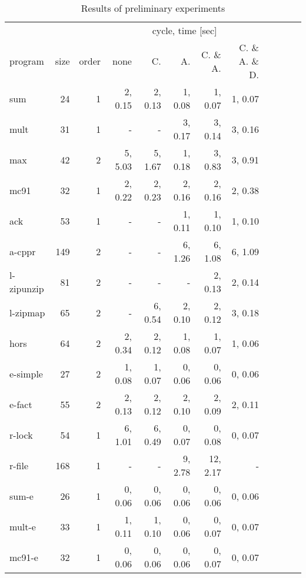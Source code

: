 \begin{table*}
\caption{Results of preliminary experiments}
\label{tbl:exp}
\small
\begin{center}
\begin{tabular}{|l|r|r|r|r|r|r|r|r|r|r|r|}
\hline
            &       &    & \multicolumn{5}{|c|}{cycle, time [sec]} \\
\cline{4-8}
program    & size & order & none &     C. &   A. &    C. \& A. & C. \& A. \& D. \\
\hline
sum               &    24&  1&  2,    0.15 & 2,    0.13 & 1,    0.08 & 1,    0.07 & 1,    0.07 \\
mult              &    31&  1&           - &          - & 3,    0.17 & 3,    0.14 & 3,    0.16 \\
max               &    42&  2&  5,    5.03 & 5,    1.67 & 1,    0.18 & 3,    0.83 & 3,    0.91 \\
mc91              &    32&  1&  2,    0.22 & 2,    0.23 & 2,    0.16 & 2,    0.16 & 2,    0.38 \\
ack               &    53&  1&           - &          - & 1,    0.11 & 1,    0.10 & 1,    0.10 \\
a-cppr            &   149&  2&           - &          - & 6,    1.26 & 6,    1.08 & 6,    1.09 \\
l-zipunzip        &    81&  2&           - &          - &          - & 2,    0.13 & 2,    0.14 \\
l-zipmap          &    65&  2&           - & 6,    0.54 & 2,    0.10 & 2,    0.12 & 3,    0.18 \\
hors              &    64&  2&  2,    0.34 & 2,    0.12 & 1,    0.08 & 1,    0.07 & 1,    0.06 \\
e-simple          &    27&  2&  1,    0.08 & 1,    0.07 & 0,    0.06 & 0,    0.06 & 0,    0.06 \\
e-fact            &    55&  2&  2,    0.13 & 2,    0.12 & 2,    0.10 & 2,    0.09 & 2,    0.11 \\
r-lock            &    54&  1&  6,    1.01 & 6,    0.49 & 0,    0.07 & 0,    0.08 & 0,    0.07 \\
r-file            &   168&  1&           - &          - & 9,    2.78 & 12,   2.17 &          - \\
sum-e             &    26&  1&  0,    0.06 & 0,    0.06 & 0,    0.06 & 0,    0.06 & 0,    0.06 \\
mult-e            &    33&  1&  1,    0.11 & 1,    0.10 & 0,    0.06 & 0,    0.07 & 0,    0.07 \\
mc91-e            &    32&  1&  0,    0.06 & 0,    0.06 & 0,    0.06 & 0,    0.07 & 0,    0.07 \\

\end{tabular}
\end{center}
\end{table*}
